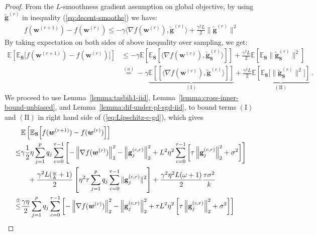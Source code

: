 \documentclass{article} %
\begin{document}
\begin{proof}
From the $L$-smoothness gradient assumption on global objective, by using  $\tilde{\mathbf{g}}^{(r)}$ in inequality (\ref{eq:decent-smoothe}) we have:
\begin{align}
    f({\boldsymbol{w}}^{(r+1)})-f({\boldsymbol{w}}^{(r)})\leq -\gamma \big\langle\nabla f({\boldsymbol{w}}^{(r)}),\tilde{\mathbf{g}}^{(r)}\big\rangle+\frac{\gamma^2 L}{2}\|\tilde{\mathbf{g}}^{(r)}\|^2\label{eq:Lipschitz-c1}
\end{align}
By taking expectation on both sides of above inequality over sampling, we get:
\begin{align}
    \mathbb{E}\left[\mathbb{E}_\mathbf{S}\Big[f({\boldsymbol{w}}^{(r+1)})-f({\boldsymbol{w}}^{(r)})\Big]\right]&\leq -\gamma\mathbb{E}\left[\mathbb{E}_\mathbf{S}\left[ \big\langle\nabla f({\boldsymbol{w}}^{(r)}),\tilde{\mathbf{g}}_\mathbf{S}^{(r)}\big\rangle\right]\right]+\frac{\gamma^2 L}{2}\mathbb{E}\left[\mathbb{E}_\mathbf{S}\|\tilde{\mathbf{g}}_\mathbf{S}^{(r)}\|^2\right]\nonumber\\
    &\stackrel{(a)}{=}-\gamma\underbrace{\mathbb{E}\left[\left[ \big\langle\nabla f({\boldsymbol{w}}^{(r)}),\tilde{\mathbf{g}}^{(r)}\big\rangle\right]\right]}_{(\mathrm{I})}+\frac{\gamma^2 L}{2}\underbrace{\mathbb{E}\left[\mathbb{E}_\mathbf{S}\Big[\|\tilde{\mathbf{g}}_\mathbf{S}^{(r)}\|^2\Big]\right]}_{\mathrm{(II)}} \ . \label{eq:Lipschitz-c-gd}
\end{align}
We proceed to use Lemma~\ref{lemma:tasbih1-iid}, Lemma~\ref{lemma:cross-inner-bound-unbiased}, and Lemma~\ref{lemma:dif-under-pl-sgd-iid}, to bound  terms $(\mathrm{I})$ and $(\mathrm{II})$ in right hand side of (\ref{eq:Lipschitz-c-gd}), which gives
\begin{align}
     &\mathbb{E}\left[\mathbb{E}_{\mathbf{S}}\Big[f({\boldsymbol{w}}^{(r+1)})-f({\boldsymbol{w}}^{(r)})\Big]\right]\nonumber\\
     \leq& \gamma\frac{1}{2}\eta\sum_{j=1}^pq_j\sum_{c=0}^{\tau-1}\left[-\left\|\nabla f({\boldsymbol{w}}^{(r)})\right\|_2^2-\left\|\mathbf{g}_j^{(c,r)}\right\|_2^2+L^2\eta^2\sum_{c=0}^{\tau-1}\left[\tau\left\|{\mathbf{g}}_j^{(c,r)}\right\|_2^2+\sigma^2\right]\right]\nonumber\\
     &\quad+\frac{\gamma^2 L(\frac{\omega}{k}+1)}{2}\left[{\eta^2\tau}\sum_{j=1}^pq_j\sum_{c=0}^{\tau-1}\|\mathbf{g}^{(c,r)}_{j}\|^2\right]+\frac{\gamma^2\eta^2 L(\omega+1)}{2}\frac{\tau \sigma^2}{k}\nonumber\\
     \stackrel{\text{\ding{192}}}{\leq}&\frac{\gamma\eta}{2}\sum_{j=1}^pq_j\sum_{c=0}^{\tau-1}\left[-\left\|\nabla f({\boldsymbol{w}}^{(r)})\right\|_2^2-\left\|\mathbf{g}_j^{(c,r)}\right\|_2^2+\tau L^2\eta^2\left[\tau\left\|{\mathbf{g}}_j^{(c,r)}\right\|_2^2+\sigma^2\right]\right]\nonumber\\

\end{align}
\end{proof}
\end{document}

